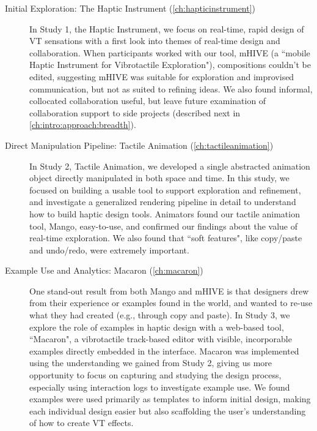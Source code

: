 \begin{description}

\item[Initial Exploration: The Haptic Instrument (\autoref{ch:hapticinstrument})]
In Study 1, the Haptic Instrument, we focus on real-time, rapid design of VT sensations with a first look into themes of real-time design and collaboration.
When participants worked with our tool, mHIVE (a ``mobile Haptic Instrument for Vibrotactile Exploration"), compositions couldn't be edited, suggesting mHIVE was suitable for exploration and improvised communication, but not as suited to refining ideas.
We also found informal, collocated collaboration useful, but leave future examination of collaboration support to side projects (described next in \autoref{ch:intro:approach:breadth}).

\item[Direct Manipulation Pipeline: Tactile Animation (\autoref{ch:tactileanimation})]
In Study 2, Tactile Animation, we developed a single abstracted animation object directly manipulated in both space and time.
In this study, we focused on building a usable tool to support exploration and refinement, and investigate a generalized rendering pipeline in detail to understand how to build haptic design tools.
Animators found our tactile animation tool, Mango, easy-to-use, and confirmed our findings about the value of real-time exploration.
We also found that ``soft features", like copy/paste and undo/redo, were extremely important.

\item[Example Use and Analytics: Macaron (\autoref{ch:macaron})]
One stand-out result from both Mango and mHIVE is that designers drew from their experience or examples found in the world, and wanted to re-use what they had created (e.g., through copy and paste).
In Study 3, we explore the role of examples in haptic design with a web-based tool, ``Macaron", a vibrotactile track-based editor with visible, incorporable examples directly embedded in the interface.
Macaron was implemented using the understanding we gained from Study 2, giving us more opportunity to focus on capturing and studying the design process, especially using interaction logs to investigate example use.
We found examples were used primarily as templates to inform initial design, making each individual design easier but also scaffolding the user's understanding of how to create VT effects.


\end{description}
